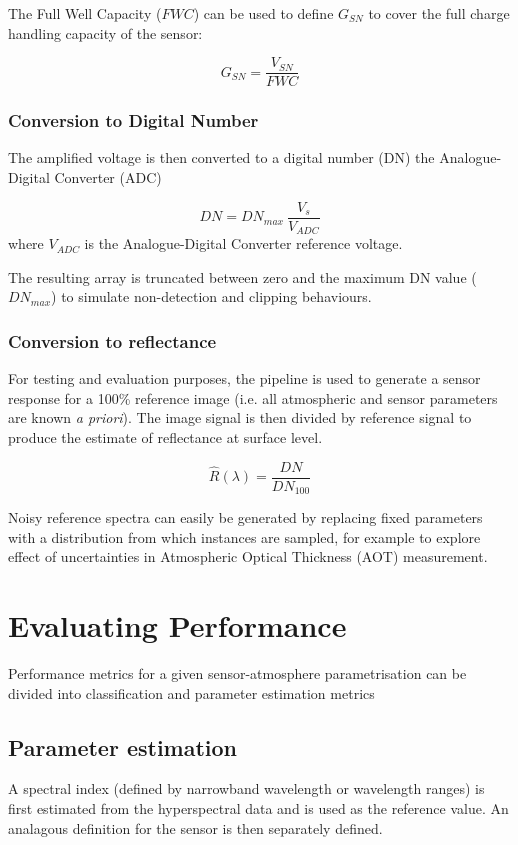 \documentclass[10pt,a4paper,final,onecolumn]{article}
\begin{document}
The Full Well Capacity ($FWC$) can be used to define $G_{SN}$ to cover the full charge handling capacity of the sensor:

\begin{equation}
G_{SN} = \frac{V_{SN}}{FWC}
\end{equation}

\subsubsection{Conversion to Digital Number}
The amplified voltage is then converted to a digital number (DN) the Analogue-Digital Converter (ADC)

\begin{equation}
DN = DN_{max}~\frac{V_s}{V_{ADC}}
\end{equation}
where $V_{ADC}$  is the Analogue-Digital Converter reference voltage.

The resulting array is truncated between zero and the maximum DN value ($DN_{max}$) to simulate non-detection and clipping behaviours.

\subsubsection{Conversion to reflectance}
For testing and evaluation purposes, the pipeline is used to generate a sensor response for a 100\% reference image (i.e. all atmospheric and sensor parameters are known \textit{a priori}). The image signal is then divided by reference signal to produce the estimate of reflectance at surface level.

\begin{equation}
\widehat{R}(\lambda)= \frac{DN}{DN_{100}}
\end{equation}

Noisy reference spectra can easily be generated by replacing fixed parameters with a distribution from which instances are sampled, for example to explore effect of uncertainties in Atmospheric Optical Thickness (AOT) measurement.

\section{Evaluating Performance}
Performance metrics for a given sensor-atmosphere parametrisation can be divided into classification and parameter estimation metrics

\subsection{Parameter estimation}
A spectral index (defined by narrowband wavelength or wavelength ranges) is first estimated from the hyperspectral data and is used as the reference value. An analagous definition for the sensor is then separately defined.
\end{document}
